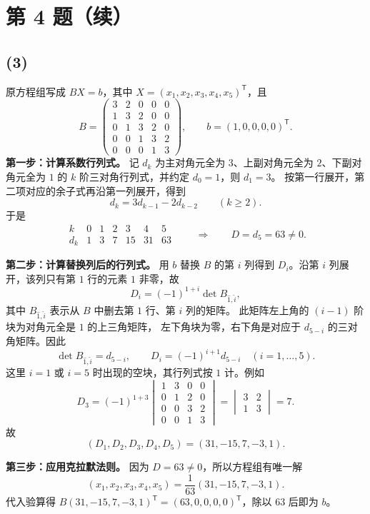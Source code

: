 \documentclass[11pt,a4paper,fontset=fandol]{ctexart}
\newcommand{\T}{^{\mathsf T}}
\newcommand{\ans}[1]{\boxed{#1}}
\begin{document}
\newpage
\section*{第 4 题（续）}
\subsection*{(3)}
原方程组写成 $BX=b$，其中 $X=(x_1,x_2,x_3,x_4,x_5)\T$，且
\[
B=\begin{pmatrix}
3&2&0&0&0\\
1&3&2&0&0\\
0&1&3&2&0\\
0&0&1&3&2\\
0&0&0&1&3
\end{pmatrix},\qquad b=(1,0,0,0,0)\T.
\]
\textbf{第一步：计算系数行列式。}
记 $d_k$ 为主对角元全为 $3$、上副对角元全为 $2$、下副对角元全为 $1$ 的
$k$ 阶三对角行列式，并约定 $d_0=1$，则 $d_1=3$。
按第一行展开，第二项对应的余子式再沿第一列展开，得到
\[
d_k=3d_{k-1}-2d_{k-2}\qquad(k\ge2).
\]
于是
\[
\begin{array}{c|rrrrrr}
k&0&1&2&3&4&5\\\hline
d_k&1&3&7&15&31&63
\end{array}
\qquad\Longrightarrow\qquad D=d_5=63\ne0.
\]

\textbf{第二步：计算替换列后的行列式。}
用 $b$ 替换 $B$ 的第 $i$ 列得到 $D_i$。沿第 $i$ 列展开，该列只有第 $1$ 行的元素 $1$ 非零，故
\[
D_i=(-1)^{1+i}\det B_{\widehat{1},\widehat{i}},
\]
其中 $B_{\widehat{1},\widehat{i}}$ 表示从 $B$ 中删去第 $1$ 行、第 $i$ 列的矩阵。
此矩阵左上角的 $(i-1)$ 阶块为对角元全是 $1$ 的上三角矩阵，
左下角块为零，右下角是对应于 $d_{5-i}$ 的三对角矩阵。因此
\[
\det B_{\widehat{1},\widehat{i}}=d_{5-i},\qquad
D_i=(-1)^{i+1}d_{5-i}\quad (i=1,\ldots,5).
\]
这里 $i=1$ 或 $i=5$ 时出现的空块，其行列式按 $1$ 计。例如
\[
D_3=(-1)^{1+3}
\begin{vmatrix}
1&3&0&0\\
0&1&2&0\\
0&0&3&2\\
0&0&1&3
\end{vmatrix}
=\begin{vmatrix}3&2\\1&3\end{vmatrix}=7.
\]
故
\[
(D_1,D_2,D_3,D_4,D_5)=(31,-15,7,-3,1).
\]

\textbf{第三步：应用克拉默法则。}
因为 $D=63\ne0$，所以方程组有唯一解
\[
\ans{(x_1,x_2,x_3,x_4,x_5)
=\frac1{63}(31,-15,7,-3,1)}.
\]
代入验算得 $B(31,-15,7,-3,1)\T=(63,0,0,0,0)\T$，除以 $63$ 后即为 $b$。
\end{document}

